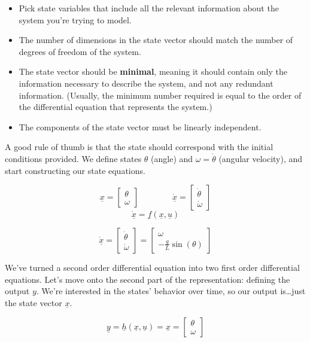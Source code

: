 \documentclass[
  letterpaper,
  DIV=11,
  numbers=noendperiod]{scrreprt}
\providecommand{\tightlist}{%
  \setlength{\itemsep}{0pt}\setlength{\parskip}{0pt}}\usepackage{longtable,booktabs,array}
\begin{document}
\begin{itemize}
\tightlist
\item
  Pick state variables that include all the relevant information about
  the system you're trying to model.
\item
  The number of dimensions in the state vector should match the number
  of degrees of freedom of the system.
\item
  The state vector should be \textbf{minimal}, meaning it should contain
  only the information necessary to describe the system, and not any
  redundant information. (Usually, the minimum number required is equal
  to the order of the differential equation that represents the system.)
\item
  The components of the state vector must be linearly independent.
\end{itemize}

A good rule of thumb is that the state should correspond with the
initial conditions provided. We define states \(\theta\) (angle) and
\(\omega = \dot{\theta}\) (angular velocity), and start constructing our
state equations.

\[\underline{x} = \begin{bmatrix}
    \theta \\
    \omega  \end{bmatrix} \qquad \qquad \underline{\dot{x}} = \begin{bmatrix}
        \dot{\theta} \\
        \dot{\omega}  \end{bmatrix}\]
\[\underline{\dot{x}} = \underline{f} (\underline{x}, \underline{u})\]

\[\dot{\underline{x}} = \begin{bmatrix}
    \dot{\theta} \\
    \dot{\omega}  \end{bmatrix} = \begin{bmatrix}
    \omega \\
    -\frac{g}{L} \sin(\theta) 
\end{bmatrix}\]

We've turned a second order differential equation into two first order
differential equations. Let's move onto the second part of the
representation: defining the output \(y\). We're interested in the
states' behavior over time, so our output is\ldots just the state vector
\(\underline{x}\).

\[\underline{y} = \underline{h}(\underline{x}, \underline{u}) = \underline{x} = \begin{bmatrix}
    \theta \\
    \omega  \end{bmatrix}\]
\end{document}
